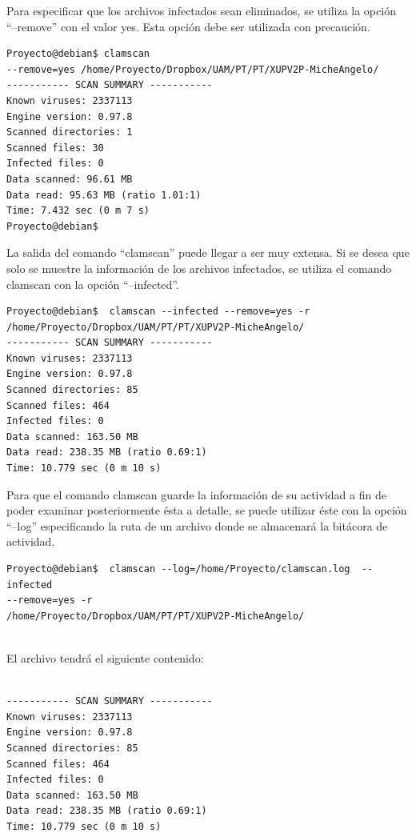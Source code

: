 Para especificar que los archivos infectados sean eliminados, se utiliza la 
opción ``--remove'' con el valor yes. Esta opción debe ser utilizada con 
precaución.

\begin{verbatim}
Proyecto@debian$ clamscan 
--remove=yes /home/Proyecto/Dropbox/UAM/PT/PT/XUPV2P-MicheAngelo/
----------- SCAN SUMMARY -----------
Known viruses: 2337113
Engine version: 0.97.8
Scanned directories: 1
Scanned files: 30
Infected files: 0
Data scanned: 96.61 MB
Data read: 95.63 MB (ratio 1.01:1)
Time: 7.432 sec (0 m 7 s)
Proyecto@debian$
\end{verbatim}

La salida del comando ``clamscan'' puede llegar a ser muy extensa. Si se 
desea que solo se muestre la información de los archivos infectados, se utiliza 
el comando clamscan con la opción ``--infected''.

\begin{verbatim}
Proyecto@debian$  clamscan --infected --remove=yes -r 
/home/Proyecto/Dropbox/UAM/PT/PT/XUPV2P-MicheAngelo/
----------- SCAN SUMMARY -----------
Known viruses: 2337113
Engine version: 0.97.8
Scanned directories: 85
Scanned files: 464
Infected files: 0
Data scanned: 163.50 MB
Data read: 238.35 MB (ratio 0.69:1)
Time: 10.779 sec (0 m 10 s)

\end{verbatim}

Para que el comando clamscan guarde la información de su actividad a fin de 
poder examinar posteriormente ésta a detalle, se puede utilizar éste con la 
opción ``--log'' especificando la ruta de un archivo donde se almacenará la 
bitácora de actividad.

\begin{verbatim}
Proyecto@debian$  clamscan --log=/home/Proyecto/clamscan.log  --infected 
--remove=yes -r 
/home/Proyecto/Dropbox/UAM/PT/PT/XUPV2P-MicheAngelo/


\end{verbatim}

El archivo tendr\'a el siguiente contenido:

\begin{verbatim}

----------- SCAN SUMMARY -----------
Known viruses: 2337113
Engine version: 0.97.8
Scanned directories: 85
Scanned files: 464
Infected files: 0
Data scanned: 163.50 MB
Data read: 238.35 MB (ratio 0.69:1)
Time: 10.779 sec (0 m 10 s)

\end{verbatim}


